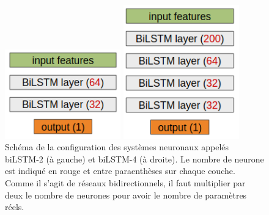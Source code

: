 \begin{figure}[thb]
  \centering
  \begin{minipage}[b]{0.49\linewidth}
      \center
      \centerline{\includegraphics[width=5cm]{./Chapitre5/figures/biLSTM2.png}}
  \end{minipage}
  \begin{minipage}[b]{0.49\linewidth}
      \center
      \centerline{\includegraphics[width=5cm]{./Chapitre5/figures/biLSTM4.png}}
  \end{minipage}
    \caption{Schéma de la configuration des systèmes neuronaux appelés biLSTM-2 (à gauche) et biLSTM-4 (à droite). Le nombre de neurone est indiqué en rouge et entre paraenthèses sur chaque couche. Comme il s'agit de réseaux bidirectionnels, il faut multiplier par deux le nombre de neurones pour avoir le nombre de paramètres réels.}
    \label{fig:biLSTM}
\end{figure}
